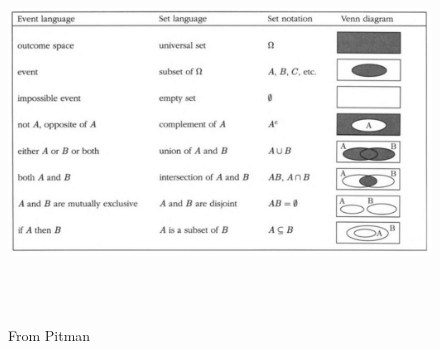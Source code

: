 \begin{figure}[!ht]
\caption{From Pitman}
\includegraphics[width=17cm, height=10cm]{intro.jpg}
\end{figure}